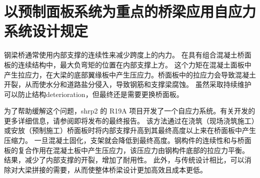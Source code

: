\chapter{以预制面板系统为重点的桥梁应用自应力系统设计规定}
\label{chp:provisions-self-stressing-system}
钢梁桥通常使用内部支撑的连续性来减少跨度上的内力。 在具有组合混凝土桥面板的连续结构中，最大负弯矩的位置在内部支撑上方。 这个力矩在混凝土面板中产生拉应力，在大梁的底部翼缘板中产生压应力。桥面板中的拉应力会导致混凝土开裂，从而使水分和道路盐分侵入，导致钢筋和支撑梁腐蚀。 虽然采取持续维护可以防止结构\gls*{deterioration}，但最终还是需要更换桥面板。

为了帮助缓解这个问题，\gls{shrp}2 的 R19A 项目开发了一个自应力系统。有关开发的更多详细信息，请参阅即将发布的最终报告。 该方法通过在浇筑（现场浇筑施工）或安放（预制施工）桥面板时将内部支撑升高到其最终高度以上来在桥面板中产生压缩力。 一旦混凝土固化，支架就会降低到最终高度。钢构件的连续性和与桥面板的复合作用在混凝土板中产生压应力，该压应力由钢构件底部的拉应力平衡。 结果，减少了内部支撑的开裂，增加了耐用性。 此外，与传统设计相比，可以消除对大梁拼接的需要，从而使整体桥梁设计更加高效且成本更低。


